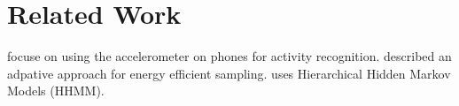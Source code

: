 
\section{Related Work}
\label{sec:related-work}

\cite{kwapisz2011activity} focuse on using the accelerometer on phones for activity recognition. \cite{yan2012energy, srinivasan2012accurate} described an adpative approach for energy efficient sampling. 
\cite{lee2011activity} uses Hierarchical Hidden Markov Models (HHMM). 
